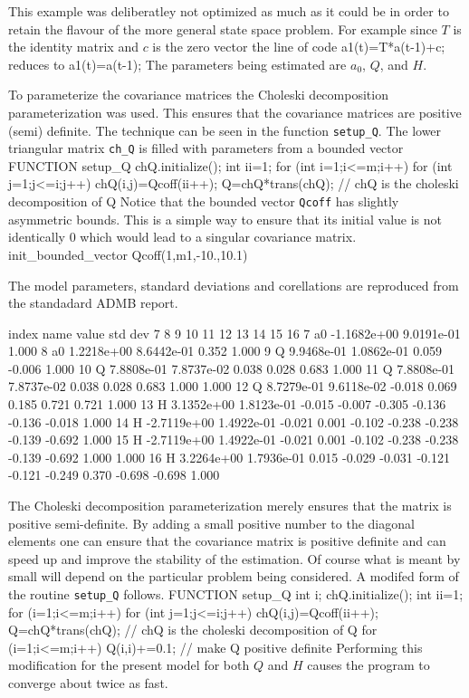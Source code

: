\endexample 
This example was deliberatley not optimized as much as it could be
in order to retain the flavour of the more general state space
problem. For example since $T$ is the identity matrix and $c$ is the
zero vector the line of code 
\beginexample
    a1(t)=T*a(t-1)+c;
\endexample 
reduces to
\beginexample
    a1(t)=a(t-1);
\endexample 
The parameters being estimated are  $a_0$, $Q$, and $H$. 

To parameterize the covariance matrices the Choleski decomposition
parameterization was used. This ensures that the covariance matrices are
positive (semi) definite. The technique can be seen in the function
{\tt setup\_Q}. 
The lower triangular matrix {\tt ch\_Q} is filled with parameters
from a bounded vector
\beginexample
FUNCTION setup_Q
  chQ.initialize();
  int ii=1;
  for (int i=1;i<=m;i++)
    for (int j=1;j<=i;j++)
      chQ(i,j)=Qcoff(ii++);
  Q=chQ*trans(chQ);   // chQ is the choleski decomposition of Q 
\endexample
Notice that the bounded vector {\tt Qcoff} has slightly asymmetric
bounds. This is a simple way to ensure that its initial value is not
identically 0 which would lead to a singular covariance matrix.
\beginexample
  init_bounded_vector Qcoff(1,m1,-10.,10.1)
\endexample

The model parameters, standard deviations and 
corellations are reproduced from the
standadard ADMB report.

\beginexample
\obeylines
\stt
 index   name    value      std dev    7      8      9     10     11     12     13     14     15      16   
    7   a0    -1.1682e+00 9.0191e-01  1.000
    8   a0     1.2218e+00 8.6442e-01  0.352  1.000
    9   Q      9.9468e-01 1.0862e-01  0.059 -0.006  1.000
   10   Q      7.8808e-01 7.8737e-02  0.038  0.028  0.683  1.000
   11   Q      7.8808e-01 7.8737e-02  0.038  0.028  0.683  1.000  1.000
   12   Q      8.7279e-01 9.6118e-02 -0.018  0.069  0.185  0.721  0.721  1.000
   13   H      3.1352e+00 1.8123e-01 -0.015 -0.007 -0.305 -0.136 -0.136 -0.018  1.000
   14   H     -2.7119e+00 1.4922e-01 -0.021  0.001 -0.102 -0.238 -0.238 -0.139 -0.692  1.000
   15   H     -2.7119e+00 1.4922e-01 -0.021  0.001 -0.102 -0.238 -0.238 -0.139 -0.692  1.000  1.000
   16   H      3.2264e+00 1.7936e-01  0.015 -0.029 -0.031 -0.121 -0.121 -0.249  0.370 -0.698 -0.698  1.000
\endexample
{}

The Choleski decomposition parameterization merely ensures that the 
matrix is positive semi-definite. By adding a small positive number to the
diagonal elements one can ensure that the covariance matrix is
positive definite and can speed up and improve the stability of the
estimation. Of course what is meant by small will depend on the
particular problem being considered. 
A modifed form of the routine {\tt setup\_Q}
follows.
\beginexample
FUNCTION setup_Q
  int i;
  chQ.initialize();
  int ii=1;
  for (i=1;i<=m;i++)
    for (int j=1;j<=i;j++)
      chQ(i,j)=Qcoff(ii++);
  Q=chQ*trans(chQ);   // chQ is the choleski decomposition of Q 
  for (i=1;i<=m;i++)
    Q(i,i)+=0.1;   // make Q positive definite
\endexample
Performing this modification for the present model for both $Q$ and
$H$ causes the program to converge about twice as fast.

